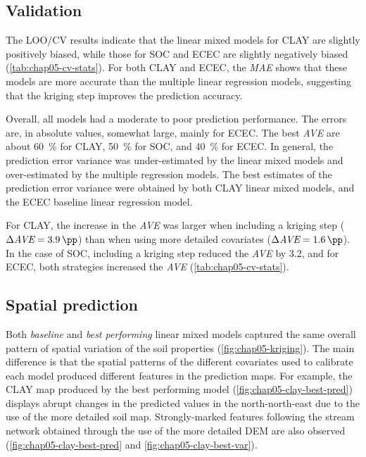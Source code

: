 \subsection{Validation}

The LOO\-/CV results indicate that the linear mixed models for CLAY are slightly positively biased, while 
those for SOC and ECEC are slightly negatively biased (\autoref{tab:chap05-cv-stats}). For both CLAY and ECEC, 
the \textit{MAE} shows that these models are more accurate than the multiple linear regression models, 
suggesting that the kriging step improves the prediction accuracy.



Overall, all models had a moderate to poor prediction performance. The errors are, in absolute values, 
somewhat large, mainly for ECEC. The best \textit{AVE} are about \SI{60}{\percent} for CLAY, \SI{50}{\percent} 
for SOC, and \SI{40}{\percent} for ECEC. In general, the prediction error variance was under-estimated by the 
linear mixed models and over-estimated by the multiple regression models. The best estimates of the prediction 
error variance were obtained by both CLAY linear mixed models, and the ECEC baseline linear regression model.

For CLAY, the increase in the \textit{AVE} was larger when including a kriging step ($\Delta\textit{AVE} = 
\SI{3.9}{\pp}$) than when using more detailed covariates ($\Delta\textit{AVE} = \SI{1.6}{\pp}$). In the case 
of SOC, including a kriging step reduced the \textit{AVE} by \SI{3.2}{\pp}, and for ECEC, both strategies 
increased the \textit{AVE} (\autoref{tab:chap05-cv-stats}).

\subsection{Spatial prediction}

Both \emph{baseline} and \emph{best performing} linear mixed models captured the same overall pattern of 
spatial variation of the soil properties (\autoref{fig:chap05-kriging}). The main difference is that the 
spatial patterns of the different covariates used to calibrate each model produced different features in the 
prediction maps. For example, the CLAY map produced by the best performing model 
(\autoref{fig:chap05-clay-best-pred}) displays abrupt changes in the predicted values in the north-north-east 
due to the use of the more detailed soil map. Strongly-marked features following the stream network obtained 
through the use of the more detailed DEM are also observed (\autoref{fig:chap05-clay-best-pred} and 
\autoref{fig:chap05-clay-best-var}).

